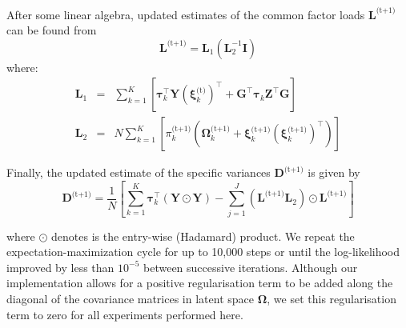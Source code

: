\documentclass[twocolumn]{aastex62}
\newcommand{\vect}[1]{\boldsymbol{\mathbf{#1}}}
\renewcommand{\vec}[1]{\vect{#1}}
\newcommand{\weight}{\pi}
\newcommand{\data}{\textbf{Y}}
\newcommand{\vecdata}{\vec\data}
\newcommand{\nextstep}{^\textrm{(t+1)}}
\newcommand{\thisstep}{^\textrm{(t)}}
\newcommand{\transpose}{^\intercal}
\newcommand{\eye}{\textbf{I}}
\newcommand{\factorloads}{\textbf{L}}
\newcommand{\specificvariance}{\vec{D}}
\newcommand{\scoremeans}{\vec\xi}
\newcommand{\scorecovs}{\vec\Omega}
\newcommand{\NumData}{N}
\newcommand{\NumComponents}{K}
\newcommand{\numcomponents}{k}
\begin{document}
After some linear algebra, updated estimates of the common factor loads $\factorloads\nextstep$
can be found from
\begin{equation}
	\factorloads\nextstep = \factorloads_{1}\left(\factorloads_{2}^{-1}\eye\right)
\end{equation}
\noindent{}where:
\begin{eqnarray}
	\factorloads_1 &=& \sum_{\numcomponents=1}^{\NumComponents}\left[ \vec\tau_\numcomponents\transpose\vecdata\left(\scoremeans_\numcomponents\thisstep\right)\transpose + 
	\vec{G}\transpose\vec\tau_\numcomponents\vec{Z}\transpose\vec{G}\right] \\
	\factorloads_2 &=& N\sum_{\numcomponents=1}^{\NumComponents}\left[\weight_\numcomponents\nextstep\left(\scorecovs_\numcomponents\nextstep + \scoremeans_\numcomponents\nextstep\left(\scoremeans_\numcomponents\nextstep\right)\transpose\right)\right]
\end{eqnarray}


Finally, the updated estimate of the specific variances $\specificvariance\nextstep$ is given
by
\begin{equation}
	\specificvariance\nextstep = \frac{1}{\NumData}\left[\sum^{\NumComponents}_{\numcomponents=1}\vec\tau_\numcomponents\transpose\left(\vecdata\odot\vecdata\right) - \sum_{j=1}^{J}\left(\factorloads\nextstep\factorloads_2\right)\odot\factorloads\nextstep\right]
\end{equation}

\noindent{}where $\odot$ denotes is the entry-wise (Hadamard) product. We repeat
the expectation-maximization cycle for up to 10,000 steps or until the log-likelihood
improved by less than $10^{-5}$ between successive iterations. Although our implementation
allows for a positive regularisation term to be added along the diagonal of the covariance
matrices in latent space $\scorecovs$, we set this regularisation term to zero for all
experiments performed here.
\end{document}
